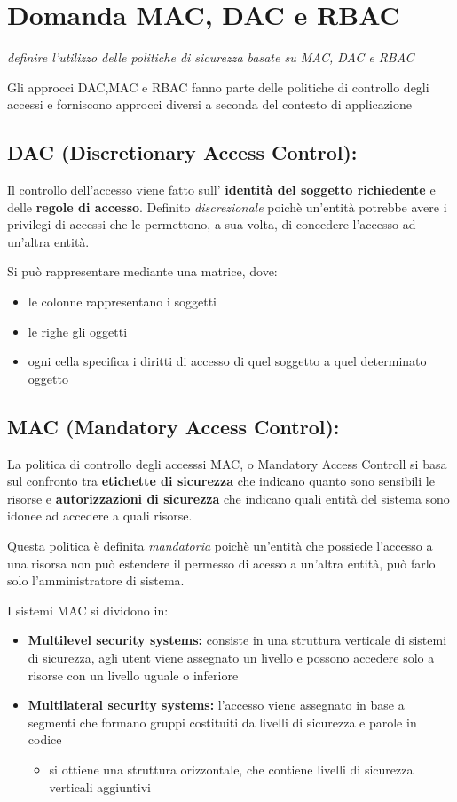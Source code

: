 \documentclass{report}
\begin{document}
\section{Domanda MAC, DAC e RBAC}
\begin{center}
    \textit{definire l'utilizzo delle politiche di sicurezza basate su MAC, DAC e RBAC}
\end{center}
\noindent Gli approcci DAC,MAC e RBAC fanno parte delle politiche di controllo degli accessi e forniscono approcci diversi
a seconda del contesto di applicazione
\subsection{DAC (Discretionary Access Control):}
\noindent Il controllo dell'accesso viene fatto sull' \textbf{identità del soggetto richiedente} e delle \textbf{regole di accesso}.
Definito \textit{discrezionale} poichè un'entità potrebbe avere i privilegi di accessi che le permettono, a sua volta, di concedere l'accesso ad un'altra entità.

\noindent Si può rappresentare mediante una matrice, dove:
\begin{itemize}
    \item le colonne rappresentano i soggetti
    \item le righe gli oggetti
    \item ogni cella specifica i diritti di accesso di quel soggetto a quel determinato oggetto
\end{itemize}


\subsection{MAC (Mandatory Access Control):} 
La politica di controllo degli accesssi MAC, o Mandatory Access Controll si basa sul confronto tra \textbf{etichette di sicurezza} che indicano quanto sono sensibili le risorse
e \textbf{autorizzazioni di sicurezza} che indicano quali entità del sistema sono idonee ad accedere a quali risorse.

\noindent Questa politica è definita \textit{mandatoria} poichè un'entità che possiede l'accesso a una risorsa non può estendere il permesso di acesso a un'altra entità,
può farlo solo l'amministratore di sistema.

\noindent I sistemi MAC si dividono in:
\begin{itemize}
    \item \textbf{Multilevel security systems:} consiste in una struttura verticale di sistemi di sicurezza, agli utent viene assegnato un livello e possono accedere solo a risorse con un livello uguale o inferiore
    \item \textbf{Multilateral security systems:} l'accesso viene assegnato in base a segmenti che formano gruppi costituiti da livelli di sicurezza e parole in codice
    \begin{itemize}
        \item si ottiene una struttura orizzontale, che contiene livelli di sicurezza verticali aggiuntivi
    \end{itemize}
\end{itemize}
\end{document}

